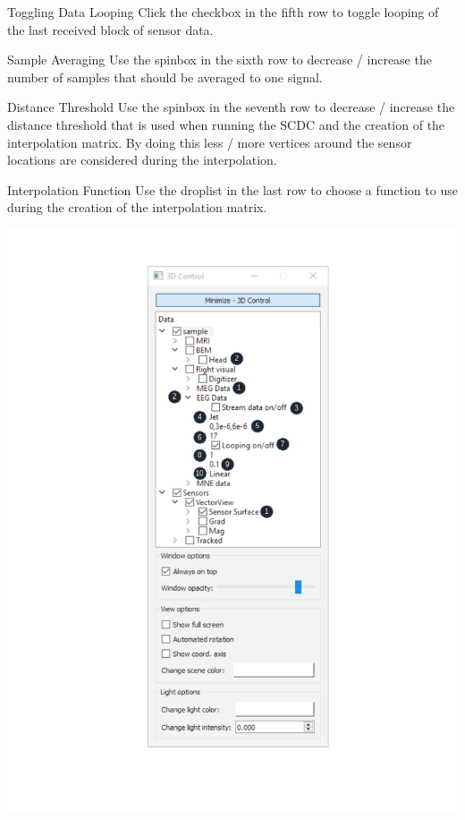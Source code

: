 \begin{aims}
	\item[\hspace*{10mm} Toggling Data Looping] Click the checkbox in the fifth row to toggle looping of the last received block of sensor data. 
\end{aims}

\begin{aims}
	\item[\hspace*{10mm} Sample Averaging] Use the spinbox in the sixth row to decrease / increase the number of samples that should be averaged to one signal. 
\end{aims}

\begin{aims}
	\item[\hspace*{10mm} Distance Threshold] Use the spinbox in the seventh row to decrease / increase the distance threshold that is used when running the SCDC and the creation of the interpolation matrix. By doing this less / more vertices around the sensor locations are considered during  the interpolation. 
\end{aims}

\begin{aims}
	\item[\hspace*{10mm} Interpolation Function] Use the droplist in the last row to choose a function to use during the creation of the interpolation matrix. 
\end{aims}


\begin{center}
		\hspace{-1.4cm}
		\includegraphics[scale=0.8]{figures/disp3D.png}
	
\end{center}


